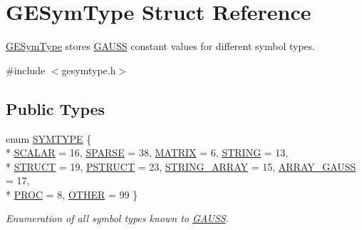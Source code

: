 \hypertarget{class_g_e_sym_type}{\section{G\-E\-Sym\-Type Struct Reference}
\label{class_g_e_sym_type}
}


\hyperlink{class_g_e_sym_type}{G\-E\-Sym\-Type} stores \hyperlink{class_g_a_u_s_s}{G\-A\-U\-S\-S} constant values for different symbol types.  




{\ttfamily \#include $<$gesymtype.\-h$>$}

\subsection*{Public Types}
\begin{DoxyCompactItemize}
\item 
enum \hyperlink{class_g_e_sym_type_a05477e08255bea70296f7825493e95fc}{S\-Y\-M\-T\-Y\-P\-E} \{ \\*
\hyperlink{class_g_e_sym_type_a05477e08255bea70296f7825493e95fca0e3633d8cf7dbbdbe3b45bdd24cae7b0}{S\-C\-A\-L\-A\-R} = 16, 
\hyperlink{class_g_e_sym_type_a05477e08255bea70296f7825493e95fcaaf5984cc491fc4b4fcf2162f18f0272c}{S\-P\-A\-R\-S\-E} = 38, 
\hyperlink{class_g_e_sym_type_a05477e08255bea70296f7825493e95fcace35d10ede406b8a2768ddac17b1d22c}{M\-A\-T\-R\-I\-X} = 6, 
\hyperlink{class_g_e_sym_type_a05477e08255bea70296f7825493e95fcad7b91a02b7bd02be62866581fb00ab77}{S\-T\-R\-I\-N\-G} = 13, 
\\*
\hyperlink{class_g_e_sym_type_a05477e08255bea70296f7825493e95fcad16784afa03e303f68740a9a33dc887b}{S\-T\-R\-U\-C\-T} = 19, 
\hyperlink{class_g_e_sym_type_a05477e08255bea70296f7825493e95fcab84d43f39e58b9cd3995b3aafc7239d6}{P\-S\-T\-R\-U\-C\-T} = 23, 
\hyperlink{class_g_e_sym_type_a05477e08255bea70296f7825493e95fcadba1b6c2cd5c27167323652b1c23c9e0}{S\-T\-R\-I\-N\-G\-\_\-\-A\-R\-R\-A\-Y} = 15, 
\hyperlink{class_g_e_sym_type_a05477e08255bea70296f7825493e95fcad3f85fecfcee857d9b08cf4ebe77c32f}{A\-R\-R\-A\-Y\-\_\-\-G\-A\-U\-S\-S} = 17, 
\\*
\hyperlink{class_g_e_sym_type_a05477e08255bea70296f7825493e95fca4793088111ff7058b2bd6e4bde07f816}{P\-R\-O\-C} = 8, 
\hyperlink{class_g_e_sym_type_a05477e08255bea70296f7825493e95fca7d507081df635250120e56c8766ec504}{O\-T\-H\-E\-R} = 99
 \}
\begin{DoxyCompactList}\small\item\em Enumeration of all symbol types known to \hyperlink{class_g_a_u_s_s}{G\-A\-U\-S\-S}. \end{DoxyCompactList}\end{DoxyCompactItemize}
